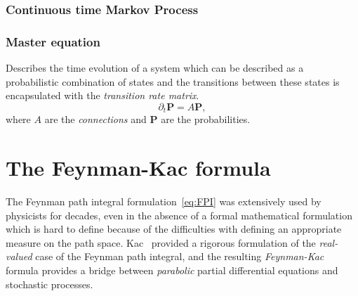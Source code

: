 \subsubsection{Continuous time Markov Process}


\subsubsection{Master equation}
Describes the time evolution of a system which can be described as a probabilistic combination of states and the transitions between these states is encapsulated with the \emph{transition rate matrix}.
\begin{equation}
	\partial_{t} \mathbf{P} = A \mathbf{P},
\end{equation}
where $A$ are the \emph{connections} and $\mathbf{P}$ are the probabilities.  

\section{The Feynman-Kac formula}
\label{subsec:fk-fk}
The Feynman path integral formulation~\eqref{eq:FPI} was extensively used by physicists for decades, even in the absence of a formal mathematical formulation which is hard to define because of the difficulties with defining an appropriate measure on the path space. Kac~\cite{kac1949distributions} provided a rigorous formulation of the \textit{real-valued} case of the Feynman path integral, and the resulting \emph{Feynman-Kac} formula provides a bridge between \emph{parabolic} partial differential equations and stochastic processes.

